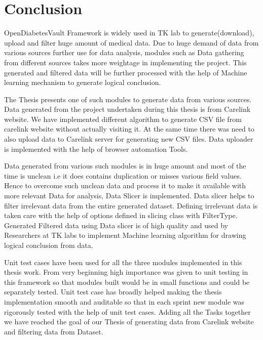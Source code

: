 \documentclass[article,type=msc,colorback,accentcolor=tud9c,twoside,11pt]{tudthesis}
\begin{document}
	\clearpage
	\section{Conclusion}
	OpenDiabetesVault Framework is widely used in TK lab to generate(download), upload and filter huge amount of medical data. Due to huge demand of data from various sources further use for data analysis, modules such as Data gathering from different sources takes more weightage in implementing the project. This generated and filtered data will be further processed with the help of Machine learning mechanism to generate logical conclusion. 
	
	The Thesis presents one of such modules to generate data from various sources. Data generated from the project undertaken during this thesis is from Carelink website. We have implemented different algorithm to generate CSV file from carelink website without actually visiting it. At the same time there was need to also upload data to Carelink server for generating new CSV files. Data uploader is implemented with the help of browser automation Tools.
	
	Data generated from various such modules is in huge amount and most of the time is unclean i.e it does contains duplication or misses various field values. Hence to overcome such unclean data and process it to make it available with more relevant Data for analysis, Data Slicer is implemented. Data slicer helps to filter irrelevant data from the entire generated dataset. Defining irrelevant data is taken care with the help of options defined in slicing class with FilterType. Generated Filtered data using Data slicer is of high quality and used by Researchers at TK labs to implement Machine learning algorithm  for drawing logical conclusion from data.
	
	Unit test cases have been used for all the three modules implemented in this thesis work. From very beginning high importance was given to unit testing in this framework so that modules built would be in small functions and could be separately tested. Unit test case has broadly helped making the thesis implementation smooth and auditable so that in each sprint new module was rigorously tested with the help of unit test cases. Adding all the Tasks together we have reached the goal of our Thesis of generating data from Carelink website and filtering data from Dataset.
	
	
	\cleardoublepage
	\cleardoublepage
	
	
\end{document}
